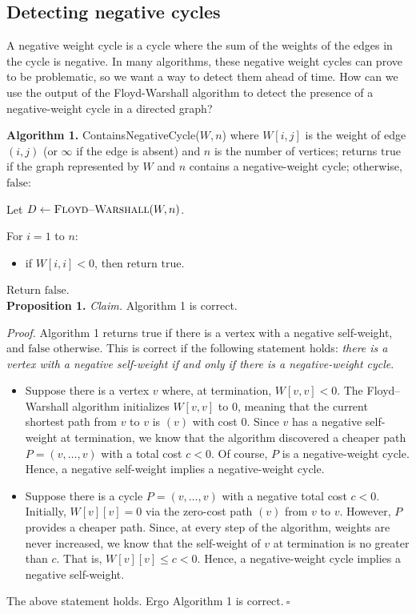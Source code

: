 \subsection{Detecting negative cycles}
A negative weight cycle is a cycle where the sum of the weights of the edges in the cycle is negative. In many algorithms, these negative weight cycles can prove to be problematic, so we want a way to detect them ahead of time. How can we use the output of the Floyd-Warshall algorithm to detect the presence
of a negative-weight cycle in a directed graph?
\begin{solution}

\textbf{Algorithm 1. }{\sc ContainsNegativeCycle}($W,n$) where $W[i,j]$ is the weight of edge $(i,j)$ (or $\infty$ if the edge is absent) and $n$ is the number of vertices; returns $\mathrm{true}$ if the graph represented by $W$ and $n$ contains a negative-weight cycle; otherwise, $\mathrm{false}$:

Let $D\leftarrow\textsc{Floyd--Warshall}(W,n)$.

For $i=1$ to $n$:
\begin{itemize}
    \item if $W[i,i]<0$, then return $\mathrm{true}$.
\end{itemize}

Return $\mathrm{false}$.\\

\textbf{Proposition 1. }\textit{Claim. }Algorithm 1 is correct.

\textit{Proof. }Algorithm 1 returns $\mathrm{true}$ if there is a vertex with a negative self-weight, and $\mathrm{false}$ otherwise. This is correct if the following statement holds: \textit{there is a vertex with a negative self-weight if and only if there is a negative-weight cycle}.
\begin{itemize}
\item Suppose there is a vertex $v$ where, at termination, $W[v,v]<0$. The {\sc Floyd--Warshall} algorithm initializes $W[v,v]$ to $0$, meaning that the current shortest path from $v$ to $v$ is $(v)$ with cost $0$. Since $v$ has a negative self-weight at termination, we know that the algorithm discovered a cheaper path $P=(v,\dots,v)$ with a total cost $c<0$. Of course, $P$ is a negative-weight cycle. Hence, a negative self-weight implies a negative-weight cycle.

\item Suppose there is a cycle $P=(v,\dots,v)$ with a negative total cost $c<0$. Initially, $W[v][v]=0$ via the zero-cost path $(v)$ from $v$ to $v$. However, $P$ provides a cheaper path. Since, at every step of the algorithm, weights are never increased, we know that the self-weight of $v$ at termination is no greater than $c$. That is, $W[v][v]\leq c<0$. Hence, a negative-weight cycle implies a negative self-weight.
\end{itemize}
The above statement holds. Ergo Algorithm 1 is correct.$~\square$
\end{solution}
\newpage
